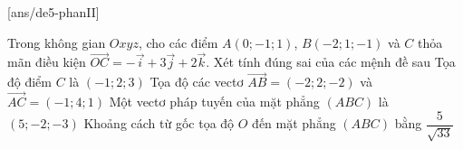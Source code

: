 \TNTF
{}[ans/de5-phanII]
\begin{ex}%
	Trong không gian $Oxyz$, cho các điểm $A(0;-1;1)$, $B(-2;1;-1)$ và $C$ thỏa mãn điều kiện $\overrightarrow{OC}=-\overrightarrow{i}+3\overrightarrow{j}+2\overrightarrow{k}$. Xét tính đúng sai của các mệnh đề sau
	\choiceTF
	{Tọa độ điểm $C$ là $(-1;2;3)$}
	{\True Tọa độ các vectơ $\overrightarrow{AB}=(-2;2;-2)$ và $\overrightarrow{AC}=(-1;4;1)$}
	{Một vectơ pháp tuyến của mặt phẳng $(ABC)$ là $(5;-2;-3)$}
	{Khoảng cách từ gốc tọa độ $O$ đến mặt phẳng $(ABC)$ bằng $\dfrac{5}{\sqrt{33}}$}
\end{ex}
